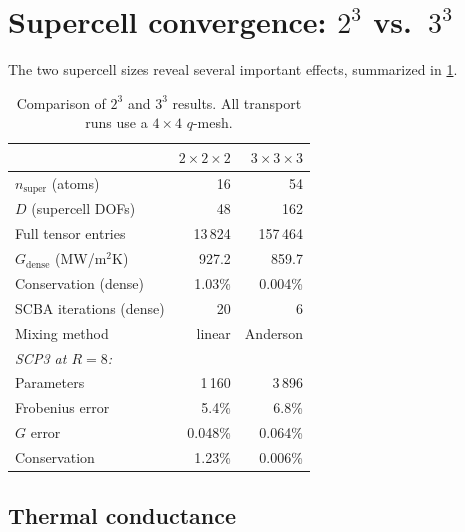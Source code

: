 \documentclass[11pt]{article}
\newcommand{\nsuper}{n_{\mathrm{super}}}
\begin{document}
\section{Supercell convergence: $2^3$ vs.\ $3^3$}
\label{sec:supercell_comparison}

The two supercell sizes reveal several important effects, summarized in
\cref{tab:supercell-comparison}.

\begin{table}[ht]
\centering
\caption{Comparison of $2^3$ and $3^3$ results.
All transport runs use a $4\!\times\!4$ $q$-mesh.}
\label{tab:supercell-comparison}
\begin{tabular}{@{}lrr@{}}
\toprule
& \textbf{$2\times2\times2$} & \textbf{$3\times3\times3$} \\
\midrule
$\nsuper$ (atoms)               & 16       & 54        \\
$D$ (supercell DOFs)            & 48       & 162       \\
Full tensor entries             & 13\,824  & 157\,464  \\
\midrule
$G_\mathrm{dense}$ (MW/m$^2$K) & 927.2    & 859.7     \\
Conservation (dense)            & 1.03\%   & 0.004\%   \\
SCBA iterations (dense)         & 20       & 6         \\
Mixing method                   & linear   & Anderson  \\
\midrule
\multicolumn{3}{l}{\textit{SCP3 at $R=8$:}} \\
\quad Parameters                & 1\,160   & 3\,896    \\
\quad Frobenius error           & 5.4\%    & 6.8\%     \\
\quad $G$ error                 & 0.048\%  & 0.064\%   \\
\quad Conservation              & 1.23\%   & 0.006\%   \\
\bottomrule
\end{tabular}
\end{table}

\subsection{Thermal conductance}
\label{sec:ganh_comparison}
\end{document}
